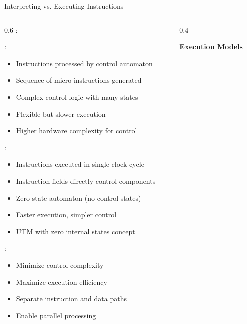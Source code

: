 \begin{frame}{Interpreting vs. Executing Instructions}
\begin{columns}
\begin{column}{0.6\textwidth}
:

\vspace{0.3cm}
:
\begin{itemize}
\item Instructions processed by control automaton
\item Sequence of micro-instructions generated
\item Complex control logic with many states
\item Flexible but slower execution
\item Higher hardware complexity for control
\end{itemize}

\vspace{0.3cm}
:
\begin{itemize}
\item Instructions executed in single clock cycle
\item Instruction fields directly control components
\item Zero-state automaton (no control states)
\item Faster execution, simpler control
\item UTM with zero internal states concept
\end{itemize}

\vspace{0.3cm}
:
\begin{itemize}
\item Minimize control complexity
\item Maximize execution efficiency
\item Separate instruction and data paths
\item Enable parallel processing
\end{itemize}
\end{column}
\begin{column}{0.4\textwidth}
\begin{center}
\textbf{Execution Models}
\vspace{0.3cm}

\end{center}
\end{column}
\end{columns}
\end{frame}

